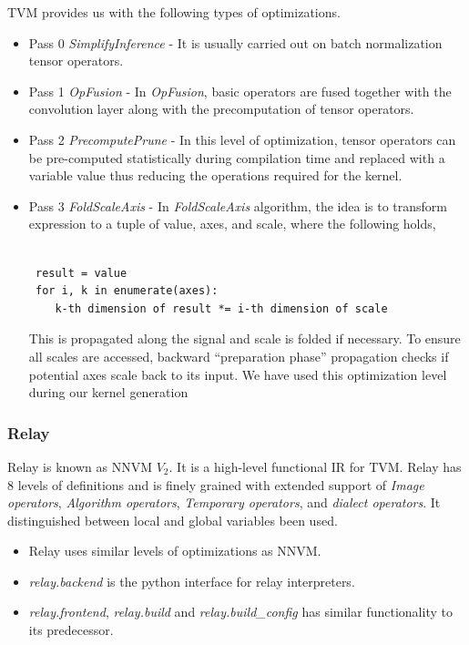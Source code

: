  TVM provides us with the following types of optimizations.
 
 \begin{itemize}
     \item Pass 0 \textit{SimplifyInference} -
It is usually carried out on batch normalization tensor operators.
 \item Pass 1 \textit{OpFusion} -
In \textit{OpFusion}, basic operators are fused together with the convolution layer along with the precomputation of tensor operators.
\item Pass  2 \textit{PrecomputePrune} -
In this level of optimization, tensor operators can be pre-computed statistically during compilation time and replaced with a variable value thus reducing the operations required for the kernel.
\item Pass  3 \textit{FoldScaleAxis} -
In \textit{FoldScaleAxis} algorithm, the idea is to transform expression to a tuple of value, axes, and scale, where the following holds,
\begin{code}[!htb]
 \begin{verbatim}

 result = value
 for i, k in enumerate(axes):
    k-th dimension of result *= i-th dimension of scale
 \end{verbatim}
\end{code}
This is propagated along the signal and scale is folded if necessary. To ensure all scales are accessed, backward “preparation phase” propagation checks if potential axes scale back to its input.
We have used this optimization level during our kernel generation
 \end{itemize}
 
  \subsubsection{Relay}
Relay is known as NNVM {$V_2$}. It is a high-level functional IR for TVM.  Relay has 8 levels of definitions and is finely grained with extended support of \textit{Image operators}, \textit{Algorithm operators}, \textit{Temporary operators}, and \textit{dialect operators}. It distinguished between local and global variables been used.

\begin{itemize}
    \item Relay uses similar levels of optimizations as NNVM.
    \item \textit{relay.backend}  is the python interface for relay interpreters.
    \item \textit{relay.frontend},  \textit{relay.build}  and \textit{relay.build\_config}  has similar functionality to its predecessor.
\end{itemize}

